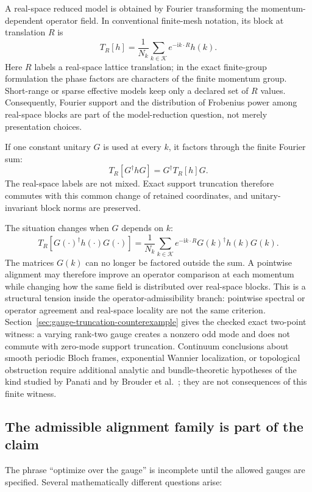 A real-space reduced model is obtained by Fourier transforming the momentum-dependent
operator field. In conventional finite-mesh notation, its block at translation $R$ is
\[
  T_R[h]
  =\frac{1}{N_k}\sum_{k\in\mathcal K}
    e^{-\mathrm{i}k\cdot R}h(k).
\]
Here $R$ labels a real-space lattice translation; in the exact finite-group formulation
the phase factors are characters of the finite momentum group. Short-range or sparse effective models keep
only a declared set of $R$ values. Consequently, Fourier support and the distribution of
Frobenius power among real-space blocks are part of the model-reduction question, not
merely presentation choices.

If one constant unitary $G$ is used at every $k$, it factors through the finite Fourier
sum:
\[
  T_R[G^\dagger hG]=G^\dagger T_R[h]G.
\]
The real-space labels are not mixed. Exact support truncation therefore commutes with
this common change of retained coordinates, and unitary-invariant block norms are
preserved.

The situation changes when $G$ depends on $k$:
\[
  T_R[G(\cdot)^\dagger h(\cdot)G(\cdot)]
  =\frac{1}{N_k}\sum_{k\in\mathcal K}
    e^{-\mathrm{i}k\cdot R}G(k)^\dagger h(k)G(k).
\]
The matrices $G(k)$ can no longer be factored outside the sum. A pointwise alignment may
therefore improve an operator comparison at each momentum while changing how the same
field is distributed over real-space blocks. This is a structural tension inside the
operator-admissibility branch: pointwise spectral or operator agreement and real-space
locality are not the same criterion. Section~\ref{sec:gauge-truncation-counterexample}
gives the checked exact two-point witness: a varying rank-two gauge creates a nonzero
odd mode and does not commute with zero-mode support truncation. Continuum conclusions
about smooth periodic Bloch frames, exponential Wannier localization, or topological
obstruction require additional analytic and bundle-theoretic hypotheses of the kind
studied by Panati and by Brouder et al.~\cite{Panati2007,BrouderEtAl2007}; they are not
consequences of this finite witness.

\subsection{The admissible alignment family is part of the claim}

The phrase ``optimize over the gauge'' is incomplete until the allowed gauges are
specified. Several mathematically different questions arise:

